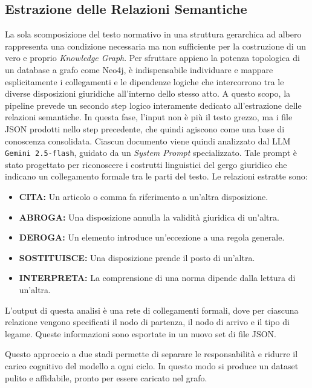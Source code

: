\subsection{Estrazione delle Relazioni Semantiche}

La sola scomposizione del testo normativo in una struttura gerarchica ad albero rappresenta una condizione necessaria ma non sufficiente per la costruzione di un vero e proprio \textit{Knowledge Graph}. Per sfruttare appieno la potenza topologica di un database a grafo come Neo4j, è indispensabile individuare e mappare esplicitamente i collegamenti e le dipendenze logiche che intercorrono tra le diverse disposizioni giuridiche all'interno dello stesso atto. A questo scopo, la pipeline prevede un secondo step logico interamente dedicato all'estrazione delle relazioni semantiche.
In questa fase, l'input non è più il testo grezzo, ma i file JSON prodotti nello step precedente, che quindi agiscono come una base di conoscenza consolidata. Ciascun documento viene quindi analizzato dal LLM \texttt{Gemini 2.5-flash}, guidato da un \textit{System Prompt} specializzato. Tale prompt è stato progettato per riconoscere i costrutti linguistici del gergo giuridico che indicano un collegamento formale tra le parti del testo. Le relazioni estratte sono:
\begin{itemize}
    \item \textbf{CITA:} Un articolo o comma fa riferimento a un'altra disposizione.
    \item \textbf{ABROGA:} Una disposizione annulla la validità giuridica di un'altra.
    \item \textbf{DEROGA:} Un elemento introduce un'eccezione a una regola generale.
    \item \textbf{SOSTITUISCE:} Una disposizione prende il posto di un'altra.
    \item \textbf{INTERPRETA:} La comprensione di una norma dipende dalla lettura di un'altra.
\end{itemize}

L'output di questa analisi è una rete di collegamenti formali, dove per ciascuna relazione vengono specificati il nodo di partenza, il nodo di arrivo e il tipo di legame. Queste informazioni sono esportate in un nuovo set di file JSON.

Questo approccio a due stadi permette di separare le responsabilità e ridurre il carico cognitivo del modello a ogni ciclo. In questo modo si produce un dataset pulito e affidabile, pronto per essere caricato nel grafo.